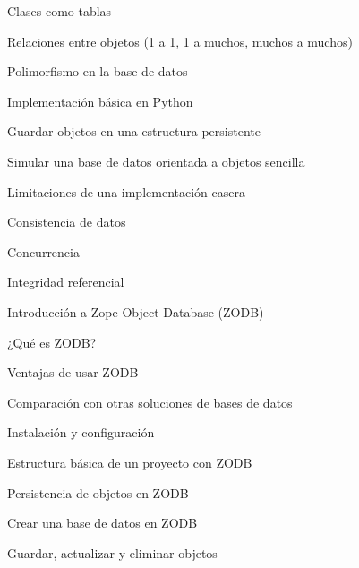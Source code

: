 \begin{longenum}
\begin{longenum}
\begin{longenum}
\begin{longenum}
                \item Clases como tablas
                \item Relaciones entre objetos (1 a 1, 1 a muchos, muchos a muchos)
                \item Polimorfismo en la base de datos
            \end{longenum}
            \item Implementación básica en Python
            \begin{longenum}
                \item Guardar objetos en una estructura persistente
                \item Simular una base de datos orientada a objetos sencilla
            \end{longenum}
            \item Limitaciones de una implementación casera
            \begin{longenum}
                \item Consistencia de datos
                \item Concurrencia
                \item Integridad referencial
            \end{longenum}
        \end{longenum}
        \item Introducción a Zope Object Database (ZODB)
        \begin{longenum}
            \item ¿Qué es ZODB?
            \begin{longenum}
                \item Ventajas de usar ZODB
                \item Comparación con otras soluciones de bases de datos
            \end{longenum}
            \item Instalación y configuración
            \begin{longenum}
                \item Estructura básica de un proyecto con ZODB
            \end{longenum}
            \item Persistencia de objetos en ZODB
            \begin{longenum}
                \item Crear una base de datos en ZODB
                \item Guardar, actualizar y eliminar objetos

\end{longenum}
\end{longenum}
\end{longenum}
\end{longenum}
